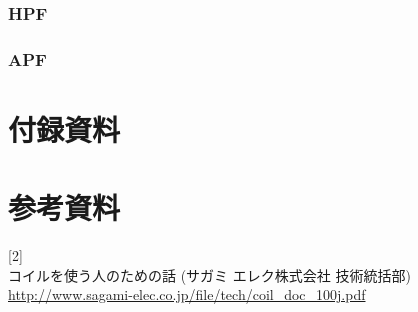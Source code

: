 \documentclass[10pt,a4j,dvipdfmx]{jsarticle}
\begin{document}
\subsubsection{HPF}
\subsubsection{APF}


\clearpage
\section{付録資料}



\section{参考資料}
[2]\\
コイルを使う人のための話 (サガミ エレク株式会社 技術統括部) \\
\href{http://www.sagami-elec.co.jp/file/tech/coil_doc_100j.pdf}{http://www.sagami-elec.co.jp/file/tech/coil_doc_100j.pdf}\\
\end{document}
